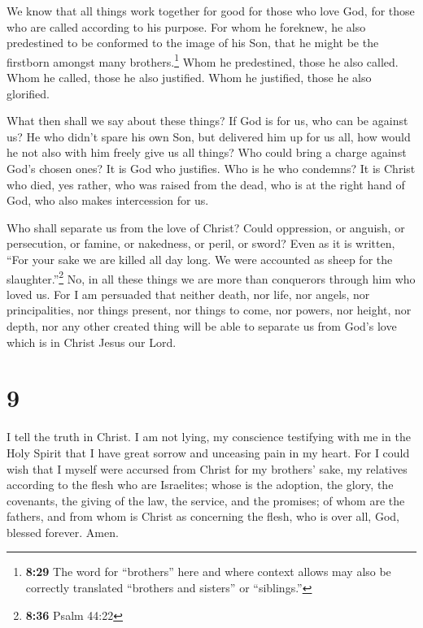  We know that all things work together for good for those
who love God, for those who are called according to his purpose.
 For whom he foreknew, he also predestined to be
conformed to the image of his Son, that he might be the firstborn
amongst many brothers.\footnote{\textbf{8:29} The word for ``brothers''
  here and where context allows may also be correctly translated
  ``brothers and sisters'' or ``siblings.''}  Whom he
predestined, those he also called. Whom he called, those he also
justified. Whom he justified, those he also glorified.

 What then shall we say about these things? If God is for
us, who can be against us?  He who didn't spare his own
Son, but delivered him up for us all, how would he not also with him
freely give us all things?  Who could bring a charge
against God's chosen ones? It is God who justifies.  Who
is he who condemns? It is Christ who died, yes rather, who was raised
from the dead, who is at the right hand of God, who also makes
intercession for us.

 Who shall separate us from the love of Christ? Could
oppression, or anguish, or persecution, or famine, or nakedness, or
peril, or sword?  Even as it is written, ``For your sake
we are killed all day long. We were accounted as sheep for the
slaughter.''\footnote{\textbf{8:36} Psalm 44:22}  No, in
all these things we are more than conquerors through him who loved us.
 For I am persuaded that neither death, nor life, nor
angels, nor principalities, nor things present, nor things to come, nor
powers,  nor height, nor depth, nor any other created
thing will be able to separate us from God's love which is in Christ
Jesus our Lord.

\hypertarget{section-8}{%
\section{9}\label{section-8}}

 I tell the truth in Christ. I am not lying, my conscience
testifying with me in the Holy Spirit  that I have great
sorrow and unceasing pain in my heart.  For I could wish
that I myself were accursed from Christ for my brothers' sake, my
relatives according to the flesh  who are Israelites;
whose is the adoption, the glory, the covenants, the giving of the law,
the service, and the promises;  of whom are the fathers,
and from whom is Christ as concerning the flesh, who is over all, God,
blessed forever. Amen.

